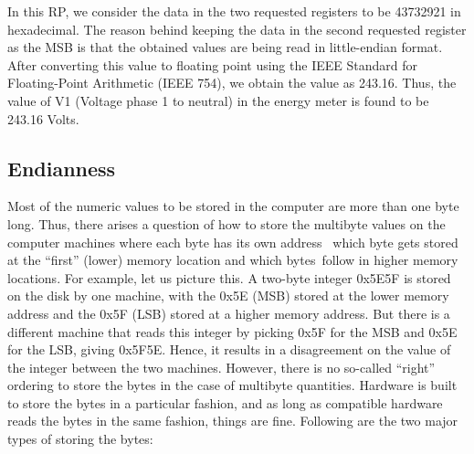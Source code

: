 In this RP, we consider the data in the two requested registers to be 43732921 
in hexadecimal. The reason behind keeping the data in the second requested register 
as the MSB is that the obtained values are being read in little-endian format.
After converting this value to floating point using the 
IEEE Standard for Floating-Point Arithmetic (IEEE 754), we obtain the 
value as 243.16. Thus, the value of V1 (Voltage phase 1 to neutral) in the 
energy meter is found to be 243.16 Volts. 

\subsection{Endianness}
Most of the numeric values to be stored in the computer are more than
one byte long. Thus, there arises a question of how to store the
multibyte values on the computer machines where each byte has its own
address \ie\ which byte gets stored at the ``first'' (lower) memory
location and which bytes follow in higher memory locations. For
example, let us picture this. A two-byte integer 0x5E5F is stored on the disk by one machine, with the 0x5E (MSB) stored at the lower memory address and the 0x5F (LSB) stored at a higher memory address. 
But there is a different machine that reads this integer by picking 0x5F for the MSB and 0x5E for the LSB, giving 0x5F5E. 
Hence, it results in a disagreement on the value of the integer between the two machines. However, there is no so-called ``right'' 
ordering to store the bytes in the case of multibyte quantities. 
Hardware is built to store the bytes in a particular fashion, and as long as compatible hardware reads the bytes in the same fashion, things are
fine. Following are the two major types of storing the bytes: 

